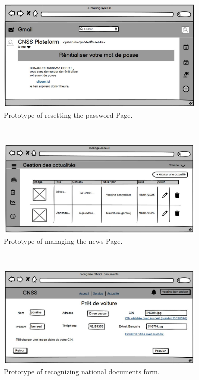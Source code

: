 \clearpage
\begin{figure}[h]
    \centering
    \includegraphics[width=0.9\textwidth]{figures/reset pass 2.JPG} 
    \caption{Prototype of resetting the password Page.}
\end{figure}\
\begin{figure}[h]
    \centering
    \includegraphics[width=0.9\textwidth]{figures/manage acceuil.JPG} 
    \caption{Prototype of managing the news Page.}
\end{figure}\
\clearpage
\begin{figure}[h]
    \centering
    \includegraphics[width=0.9\textwidth]{figures/AI.JPG} 
    \caption{Prototype of recognizing national documents form.}
\end{figure}\

